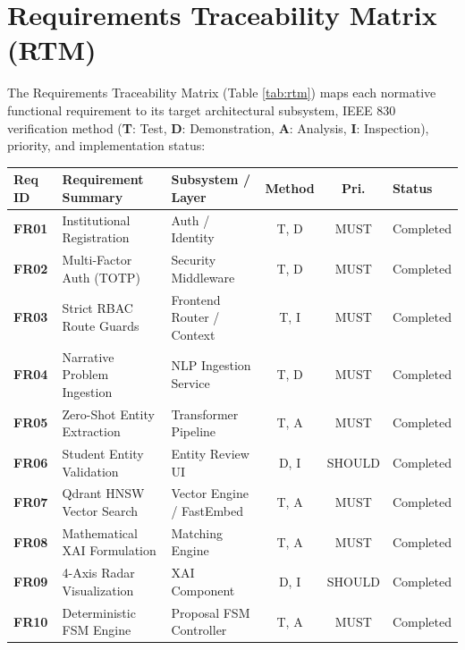 \documentclass[10.5pt,a4paper]{article}
\begin{document}
\clearpage

\section{Requirements Traceability Matrix (RTM)}

The Requirements Traceability Matrix (Table \ref{tab:rtm}) maps each normative functional requirement to its target architectural subsystem, IEEE 830 verification method (\textbf{T}: Test, \textbf{D}: Demonstration, \textbf{A}: Analysis, \textbf{I}: Inspection), priority, and implementation status:

\begin{table}[h]
\centering
\small
\begin{tabularx}{\linewidth}{|l|l|l|c|c|l|}
\hline
\rowcolor{headergray} \textbf{Req ID} & \textbf{Requirement Summary} & \textbf{Subsystem / Layer} & \textbf{Method} & \textbf{Pri.} & \textbf{Status} \\ \hline
\textbf{FR01} & Institutional Registration & Auth / Identity & T, D & MUST & Completed \\ \hline
\textbf{FR02} & Multi-Factor Auth (TOTP) & Security Middleware & T, D & MUST & Completed \\ \hline
\textbf{FR03} & Strict RBAC Route Guards & Frontend Router / Context & T, I & MUST & Completed \\ \hline
\textbf{FR04} & Narrative Problem Ingestion & NLP Ingestion Service & T, D & MUST & Completed \\ \hline
\textbf{FR05} & Zero-Shot Entity Extraction & Transformer Pipeline & T, A & MUST & Completed \\ \hline
\textbf{FR06} & Student Entity Validation & Entity Review UI & D, I & SHOULD & Completed \\ \hline
\textbf{FR07} & Qdrant HNSW Vector Search & Vector Engine / FastEmbed & T, A & MUST & Completed \\ \hline
\textbf{FR08} & Mathematical XAI Formulation & Matching Engine & T, A & MUST & Completed \\ \hline
\textbf{FR09} & 4-Axis Radar Visualization & XAI Component & D, I & SHOULD & Completed \\ \hline
\textbf{FR10} & Deterministic FSM Engine & Proposal FSM Controller & T, A & MUST & Completed \\ \hline

\end{tabularx}
\end{table}
\end{document}
